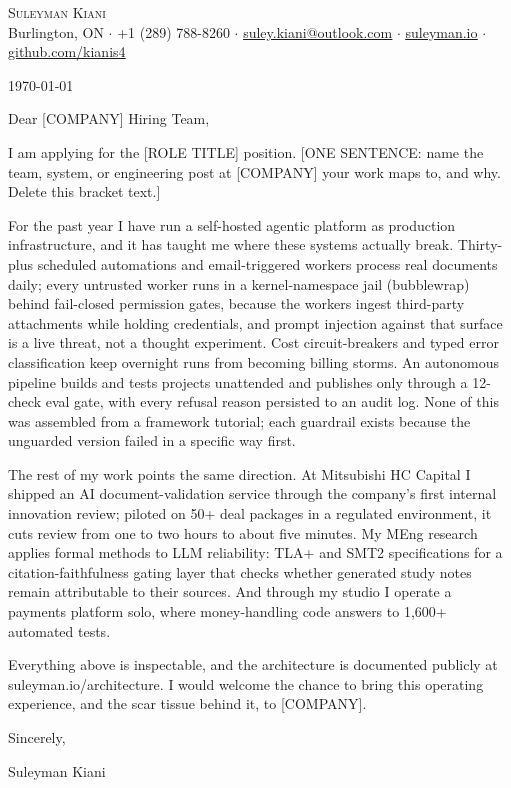 \documentclass[letterpaper,11pt]{article}
\newcommand{\company}{[COMPANY]}
\newcommand{\role}{[ROLE TITLE]}
\newcommand{\hook}{[ONE SENTENCE: name the team, system, or engineering post at \company{} your work maps to, and why. Delete this bracket text.]}
\begin{document}
\begin{center}
    {\Huge \scshape Suleyman Kiani} \\ \vspace{3pt}
    \small Burlington, ON $\cdot$ +1 (289) 788-8260 $\cdot$ \href{mailto:suley.kiani@outlook.com}{\underline{suley.kiani@outlook.com}} $\cdot$ \href{https://suleyman.io}{\underline{suleyman.io}} $\cdot$ \href{https://github.com/kianis4}{\underline{github.com/kianis4}}
\end{center}

\vspace{8pt}
\today

Dear \company{} Hiring Team,

I am applying for the \role{} position. \hook{}

For the past year I have run a self-hosted agentic platform as production infrastructure, and it has taught me where these systems actually break. Thirty-plus scheduled automations and email-triggered workers process real documents daily; every untrusted worker runs in a kernel-namespace jail (bubblewrap) behind fail-closed permission gates, because the workers ingest third-party attachments while holding credentials, and prompt injection against that surface is a live threat, not a thought experiment. Cost circuit-breakers and typed error classification keep overnight runs from becoming billing storms. An autonomous pipeline builds and tests projects unattended and publishes only through a 12-check eval gate, with every refusal reason persisted to an audit log. None of this was assembled from a framework tutorial; each guardrail exists because the unguarded version failed in a specific way first.

The rest of my work points the same direction. At Mitsubishi HC Capital I shipped an AI document-validation service through the company's first internal innovation review; piloted on 50+ deal packages in a regulated environment, it cuts review from one to two hours to about five minutes. My MEng research applies formal methods to LLM reliability: TLA+ and SMT2 specifications for a citation-faithfulness gating layer that checks whether generated study notes remain attributable to their sources. And through my studio I operate a payments platform solo, where money-handling code answers to 1,600+ automated tests.

Everything above is inspectable, and the architecture is documented publicly at suleyman.io/architecture. I would welcome the chance to bring this operating experience, and the scar tissue behind it, to \company{}.

Sincerely,

Suleyman Kiani
\end{document}

